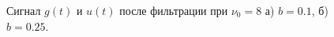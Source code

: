 \documentclass[a5paper, 10pt]{article}
\theoremstyle{definition}
\theoremstyle{plain}
\theoremstyle{remark}
\begin{document}
\begin{figure}[h!]
\begin{minipage}[h]{0.5\linewidth}
\end{minipage}
\hfill
\begin{minipage}[h]{0.5\linewidth}
\end{minipage}
\caption{Сигнал $g(t)$ и $u(t)$ после фильтрации при $\nu_0 = 8$ а) $b=0.1$, б) $b=0.25$.}


\end{figure}
\end{document}
